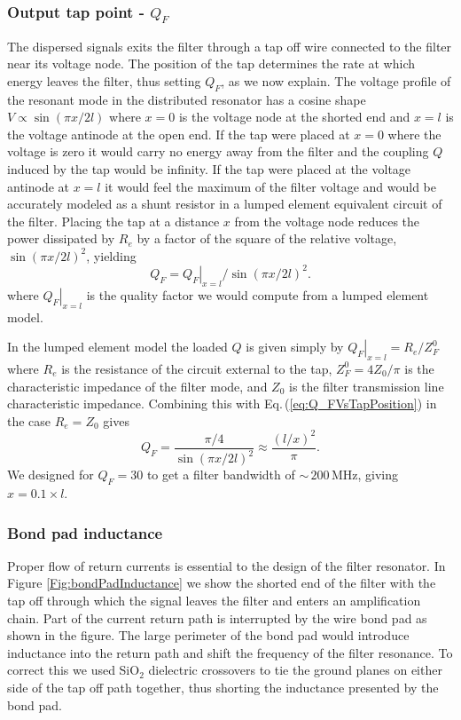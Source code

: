 \subsubsection{Output tap point - $Q_F$}

The dispersed signals exits the filter through a tap off wire connected to the filter near its voltage node.
The position of the tap determines the rate at which energy leaves the filter, thus setting $Q_F$, as we now explain.
The voltage profile of the resonant mode in the distributed resonator has a cosine shape $V \propto \sin \left( \pi x/ 2 l \right)$ where $x=0$ is the voltage node at the shorted end and $x=l$ is the voltage antinode at the open end.
If the tap were placed at $x=0$ where the voltage is zero it would carry no energy away from the filter and the coupling $Q$ induced by the tap would be infinity.
If the tap were placed at the voltage antinode at $x=l$ it would feel the maximum of the filter voltage and would be accurately modeled as a shunt resistor in a lumped element equivalent circuit of the filter.
Placing the tap at a distance $x$ from the voltage node reduces the power dissipated by $R_e$ by a factor of the square of the relative voltage, $\sin \left( \pi x / 2 l \right)^2$, yielding \begin{equation}
Q_F = \left. Q_F \right|_{x=l} / \sin \left( \pi x / 2 l \right)^2. \label{eq:Q_FVsTapPosition} \end{equation}
where $\left. Q_F \right| _{x=l}$ is the quality factor we would compute from a lumped element model.

In the lumped element model the loaded $Q$ is given simply by $\left. Q_F \right|_{x=l} = R_e / Z_F^0$ where $R_e$ is the resistance of the circuit external to the tap, $Z_F^0 = 4Z_0/\pi$ is the characteristic impedance of the filter mode, and $Z_0$ is the filter transmission line characteristic impedance.
Combining this with Eq.\,(\ref{eq:Q_FVsTapPosition}) in the case $R_e = Z_0$ gives \begin{equation}
Q_F = \frac{\pi / 4}{\sin \left( \pi x / 2 l \right)^2} \approx \frac{(l/x)^2}{\pi}. \end{equation}
We designed for $Q_F=30$ to get a filter bandwidth of $\sim\,200\,\text{MHz}$, giving $x = 0.1 \times l$.

\subsubsection{Bond pad inductance}

Proper flow of return currents is essential to the design of the filter resonator.
In Figure \ref{Fig:bondPadInductance} we show the shorted end of the filter with the tap off through which the signal leaves the filter and enters an amplification chain.
Part of the current return path is interrupted by the wire bond pad as shown in the figure.
The large perimeter of the bond pad would introduce inductance into the return path and shift the frequency of the filter resonance.
To correct this we used SiO$_2$ dielectric crossovers to tie the ground planes on either side of the tap off path together, thus shorting the inductance presented by the bond pad.

